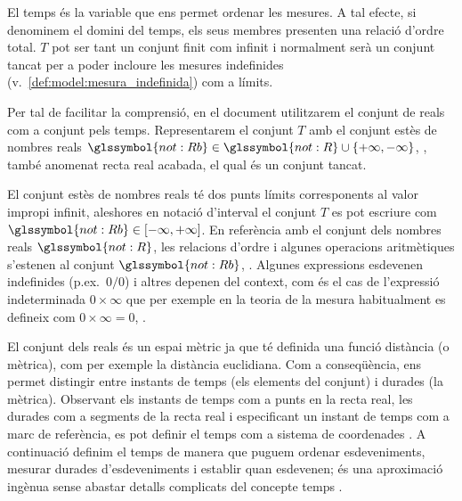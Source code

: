 El temps és la variable que ens permet ordenar les mesures.  A tal
efecte, si denominem  el domini
del temps, els seus membres presenten una relació d'ordre total. $T$
pot ser tant un conjunt finit com infinit i normalment serà un conjunt
tancat %
per a poder incloure les mesures indefinides (v.\
\autoref{def:model:mesura_indefinida}) com a límits.

Per tal de facilitar la comprensió, en el document utilitzarem el
conjunt de reals com a conjunt pels temps. Representarem el conjunt
$T$ amb el conjunt estès de nombres reals $\glssymbol{not:Rb} \in
\glssymbol{not:R} \cup
\{+\infty,-\infty\}$, \parencite{wiki:extendedreal,cantrell:extendedreal},
també anomenat recta real acabada, el qual és un conjunt tancat.

El conjunt estès de nombres reals té dos punts límits corresponents al
valor impropi infinit, aleshores en notació d'interval el conjunt $T$
es pot escriure com $\glssymbol{not:Rb} \in [-\infty,+\infty]$. En referència
amb el conjunt dels nombres reals $\glssymbol{not:R}$, les relacions d'ordre i
algunes operacions aritmètiques s'estenen al conjunt $\glssymbol{not:Rb}$,
\cite{cantrell:extendedreal}.  Algunes expressions esdevenen
indefinides (p.ex.\ $0/0$) i altres depenen del context, com és el cas
de l'expressió indeterminada $0 \times \infty$ que per exemple en la
teoria de la mesura habitualment es defineix com $0 \times \infty =
0$, \cite{wiki:extendedreal}.


El conjunt dels reals és un espai mètric ja que té definida una funció
distància (o mètrica), com per exemple la distància euclidiana. Com a
conseqüència, ens permet distingir entre instants de temps (els
elements del conjunt) i durades (la mètrica). Observant els instants
de temps com a punts en la recta real, les durades com a segments de
la recta real i especificant un instant de temps com a marc de
referència, es pot definir el temps com a sistema de
coordenades \parencite{iep:time-supplement,kopetz11:realtime}. A
continuació definim el temps de manera que puguem ordenar
esdeveniments, mesurar durades d'esdeveniments i establir quan
esdevenen; és una aproximació ingènua sense abastar detalls complicats
del concepte temps \parencite{iep:time}.




